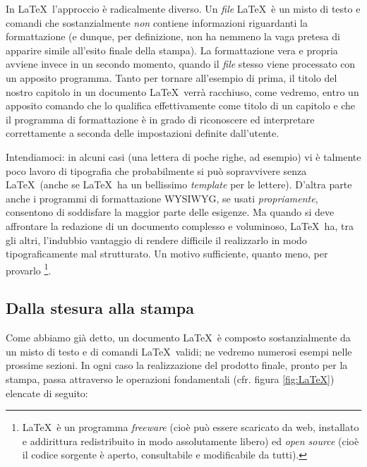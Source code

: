 In \LaTeX\ l'approccio \`e radicalmente diverso. Un \emph{file} \LaTeX\ \`e
un misto di testo e comandi che sostanzialmente \emph{non} contiene
informazioni riguardanti la formattazione (e dunque, per definizione, non ha
nemmeno la vaga pretesa di apparire simile all'esito finale della stampa).
La formattazione vera e propria avviene invece in un secondo momento, quando
il \emph{file} stesso viene processato con un apposito programma. Tanto per
tornare all'esempio di prima, il titolo del nostro capitolo in un documento
\LaTeX\ verr\`a racchiuso, come vedremo, entro un apposito comando che lo
qualifica effettivamente come titolo di un capitolo e che il programma di
formattazione \`e in grado di riconoscere ed interpretare correttamente a
seconda delle impostazioni definite dall'utente.

Intendiamoci: in alcuni casi (una lettera di poche righe, ad esempio) vi \`e
talmente poco lavoro di tipografia che probabilmente si pu\`o sopravvivere
senza \LaTeX\ (anche se \LaTeX\ ha un bellissimo \emph{template} per le
lettere). D'altra parte anche i programmi di formattazione WYSIWYG, se usati
\emph{propriamente}, consentono di soddisfare la maggior parte delle esigenze.
Ma quando si deve affrontare la redazione di un documento complesso e
voluminoso, \LaTeX\ ha, tra gli altri, l'indubbio vantaggio di
rendere difficile il realizzarlo in modo tipograficamente mal strutturato.
Un motivo sufficiente, quanto meno, per provarlo%
\footnote{
\LaTeX\ \`e un programma \emph{freeware} (cio\`e pu\`o essere scaricato da
web, installato e addirittura redistribuito in modo assolutamente
libero) ed \emph{open source} (cio\`e il codice sorgente \`e aperto,
consultabile e modificabile da tutti).}.


\subsection{Dalla stesura alla stampa}

Come abbiamo gi\`a detto, un documento \LaTeX\ \`e composto sostanzialmente da
un misto di testo e di comandi \LaTeX\ validi; ne vedremo numerosi esempi
nelle prossime sezioni.
In ogni caso la realizzazione del prodotto finale, pronto per la stampa,
passa attraverso le operazioni fondamentali (cfr. figura \ref{fig:LaTeX})
elencate di seguito:

